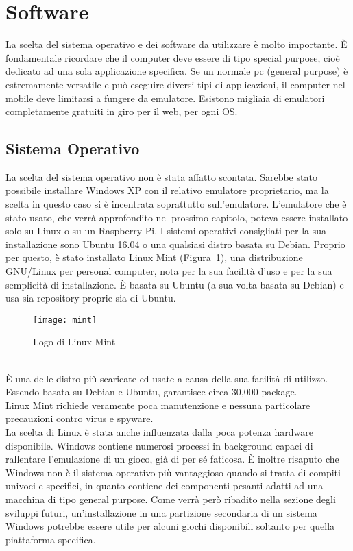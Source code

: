 \section{Software}
La scelta del sistema operativo e dei software da utilizzare è molto importante. È fondamentale ricordare che il computer deve essere di tipo special purpose, cioè dedicato ad una sola applicazione specifica. Se un normale pc (general purpose) è estremamente versatile e può eseguire diversi tipi di applicazioni, il computer nel mobile deve limitarsi a fungere da emulatore. Esistono migliaia di emulatori completamente gratuiti in giro per il web, per ogni OS. 
\subsection{Sistema Operativo}
La scelta del sistema operativo non è stata affatto scontata. Sarebbe stato possibile installare Windows XP con il relativo emulatore proprietario, ma la scelta in questo caso si è incentrata soprattutto sull’emulatore. L’emulatore che è stato usato, che verrà approfondito nel prossimo capitolo, poteva essere installato solo su Linux o su un Raspberry Pi. I sistemi operativi consigliati per la sua installazione sono Ubuntu 16.04 o una qualsiasi distro basata su Debian. Proprio per questo, è stato installato Linux Mint  (Figura~\ref{fig:mint}), una distribuzione GNU/Linux per personal computer, nota per la sua facilità d'uso e per la sua semplicità di installazione. È basata su Ubuntu (a sua volta basata su Debian) e usa sia repository proprie sia di Ubuntu.\\
\begin{figure}[!ht]
\texttt{[image: mint]}
\centering
\caption{Logo di Linux Mint}
\label{fig:mint}
\end{figure}
\\È una delle distro più scaricate ed usate a causa della sua facilità di utilizzo.\\Essendo basata su Debian e Ubuntu, garantisce circa 30,000 package.\\Linux Mint richiede veramente poca manutenzione e nessuna particolare precauzioni contro virus e spyware.\\La scelta di Linux è stata anche influenzata dalla poca potenza hardware disponibile. Windows contiene numerosi processi in background capaci di rallentare l’emulazione di un gioco, già di per sé faticosa. È inoltre risaputo che Windows non è il sistema operativo più vantaggioso quando si tratta di compiti univoci e specifici, in quanto contiene dei componenti pesanti adatti ad una macchina di tipo general purpose. Come verrà però ribadito nella sezione degli sviluppi futuri, un’installazione in una partizione secondaria di un sistema Windows potrebbe essere utile per alcuni giochi disponibili soltanto per quella piattaforma specifica. 
